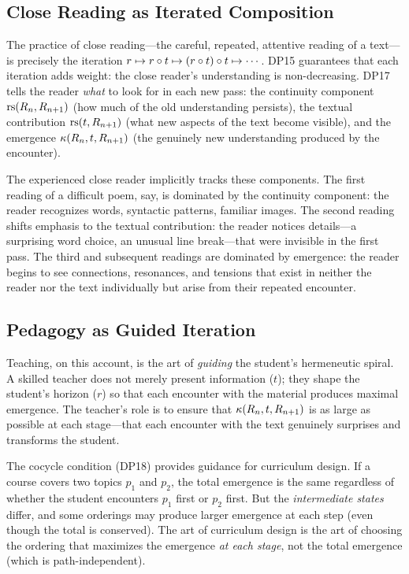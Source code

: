 \subsection{Close Reading as Iterated Composition}

The practice of close reading---the careful, repeated, attentive reading
of a text---is precisely the iteration
$r \mapsto r \circ t \mapsto (r \circ t) \circ t \mapsto
\cdots$. DP15 guarantees that each iteration adds weight: the close
reader's understanding is non-decreasing. DP17 tells the reader
\emph{what} to look for in each new pass: the continuity component
$\mathrm{rs}(R_n, R_{n+1})$ (how much of the old understanding persists), the
textual contribution $\mathrm{rs}(t, R_{n+1})$ (what new aspects of the text
become visible), and the emergence $\kappa(R_n, t, R_{n+1})$ (the
genuinely new understanding produced by the encounter).

The experienced close reader implicitly tracks these components. The
first reading of a difficult poem, say, is dominated by the continuity
component: the reader recognizes words, syntactic patterns, familiar
images. The second reading shifts emphasis to the textual contribution:
the reader notices details---a surprising word choice, an unusual line
break---that were invisible in the first pass. The third and subsequent
readings are dominated by emergence: the reader begins to see
connections, resonances, and tensions that exist in neither the reader
nor the text individually but arise from their repeated encounter.

\subsection{Pedagogy as Guided Iteration}

Teaching, on this account, is the art of \emph{guiding} the student's
hermeneutic spiral. A skilled teacher does not merely present
information ($t$); they shape the student's horizon ($r$) so that each
encounter with the material produces maximal emergence. The teacher's
role is to ensure that $\kappa(R_n, t, R_{n+1})$ is as large as
possible at each stage---that each encounter with the text genuinely
surprises and transforms the student.

The cocycle condition (DP18) provides guidance for curriculum design.
If a course covers two topics $p_1$ and $p_2$, the total emergence is
the same regardless of whether the student encounters $p_1$ first or
$p_2$ first. But the \emph{intermediate states} differ, and some
orderings may produce larger emergence at each step (even though the
total is conserved). The art of curriculum design is the art of choosing
the ordering that maximizes the emergence \emph{at each stage}, not the
total emergence (which is path-independent).

